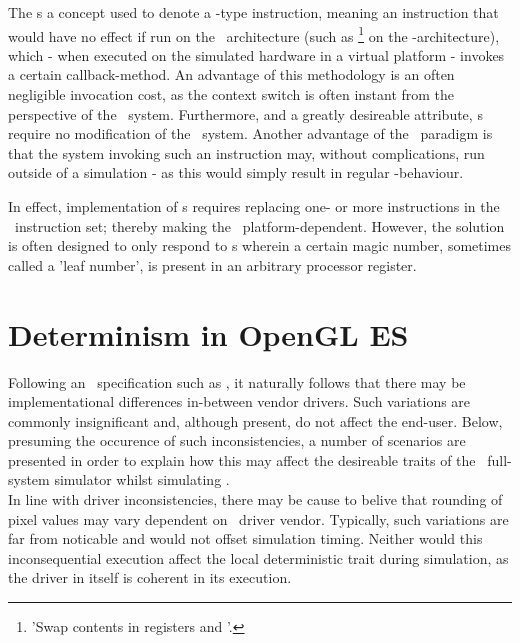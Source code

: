 The \dvttermmagicinstruction s a concept used to denote a -type instruction, meaning an instruction that would have no effect if run on the \dvttermtarget\ architecture (such as \footnote{'Swap contents in registers  and '.} on the \dvttermxeightysix -architecture), which - when executed on the simulated hardware in a virtual platform - invokes a certain callback-method.
An advantage of this methodology is an often negligible invocation cost, as the context switch is often instant from the perspective of the \dvttermtarget\ system.
Furthermore, and a greatly desireable attribute, \dvttermmagicinstruction s require no modification of the \dvttermtarget\ system.
Another advantage of the \dvttermmagicinstruction\ paradigm is that the system invoking such an instruction may, without complications, run outside of a simulation - as this would simply result in regular -behaviour.

In effect, implementation of \dvttermmagicinstruction s requires replacing one- or more instructions in the \dvttermtarget\ instruction set; thereby making the \dvttermmagicinstruction\ platform-dependent.
However, the solution is often designed to only respond to \dvttermmagicinstruction s wherein a certain magic number, sometimes called a 'leaf number', is present in an arbitrary processor register.

\section*{Determinism in OpenGL ES}
\label{sec:appendixa_determinisminopengles}
Following an \dvttermapi\ specification such as \dvttermopengles , it naturally follows that there may be implementational differences in-between vendor drivers.
Such variations are commonly insignificant and, although present, do not affect the end-user.
Below, presuming the occurence of such inconsistencies, a number of scenarios are presented in order to explain how this may affect the desireable traits of the \dvttermsimics\ full-system simulator whilst simulating \dvttermopengles .\\

\noindent
In line with driver inconsistencies, there may be cause to belive that rounding of pixel values may vary dependent on \dvttermhost\ driver vendor.
Typically, such variations are far from noticable and would not offset simulation timing.
Neither would this inconsequential execution affect the local deterministic trait during simulation, as the driver in itself is coherent in its execution.

